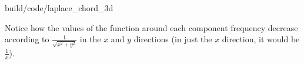 \begin{svg}{build/code/laplace_chord_3d}
  \caption{Laplace transform of Fmajor4 chord plotted in 3D}
  \label{fig:laplace_chord_3d}
\end{svg}

Notice how the values of the function around each component frequency decrease
according to $\frac{1}{\sqrt{x^2 + y^2}}$ in the $x$ and $y$ directions (in just
the $x$ direction, it would be $\frac{1}{x}$).

